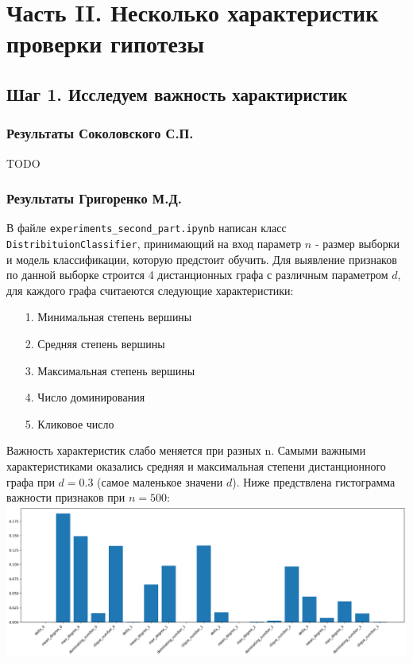 \documentclass[a4paper,12pt]{article}
\begin{document}
\section{Часть II. Несколько характеристик проверки гипотезы}
\subsection{Шаг 1. Исследуем важность характиристик}
\subsubsection*{Результаты Соколовского С.П.}
TODO

\subsubsection*{Результаты Григоренко М.Д.}
В файле \texttt{experiments\_second\_part.ipynb} написан класс \texttt{DistribituionClassifier}, принимающий на вход параметр $n$ - размер выборки и модель классификации, которую предстоит обучить. Для выявление признаков по данной выборке строится 4 дистанционных графа с различным параметром $d$, для каждого графа считаеются следующие характеристики:
\begin{itemize}
    \item[1.] Минимальная степень вершины
    \item[2.] Средняя степень вершины
    \item[3.] Максимальная степень вершины
    \item[4.] Число доминирования
    \item[5.] Кликовое число
\end{itemize}
Важность характеристик слабо меняется при разных n. Самыми важными характеристиками оказались средняя и максимальная степени дистанционного графа при $d = 0.3$ (самое маленькое значени $d$). Ниже предствлена гистограмма важности признаков при $n = 500$: \newline
\includegraphics[width=\textwidth]{images/importances_barplot.png}
\end{document}
